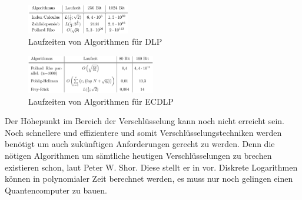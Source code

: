 	\begin{figure}
		\centering
		\includegraphics[width=0.4\textwidth]{includes/images/LaufzeitenDLP.PNG}
		\caption{Laufzeiten von Algorithmen für DLP~\cite{DLP:ECDLP:Probleme:und:Loesungen}}
		\label{fig_LaufzeitenDLP}
	\end{figure}
	
	\begin{figure}
		\centering
		\includegraphics[width=0.5\textwidth]{includes/images/LaufzeitenECDLP.PNG}
		\caption{Laufzeiten von Algorithmen für ECDLP~\cite{DLP:ECDLP:Probleme:und:Loesungen}}
		\label{fig_LaufzeitenECDLP}
	\end{figure}
	
	Der Höhepunkt im Bereich der Verschlüsselung kann noch nicht erreicht sein. Noch schnellere und effizientere und somit  Verschlüsselungstechniken werden benötigt um auch zukünftigen Anforderungen gerecht zu werden. Denn die nötigen Algorithmen um sämtliche heutigen Verschlüsselungen zu brechen existieren schon, laut Peter W. Shor. Diese stellt er in \cite{Algorithms:for:Quantum:Computation:Discrete:Logarithms:and:Factoring} vor. Diskrete Logarithmen können in polynomialer Zeit berechnet werden, es muss nur noch gelingen einen Quantencomputer zu bauen.